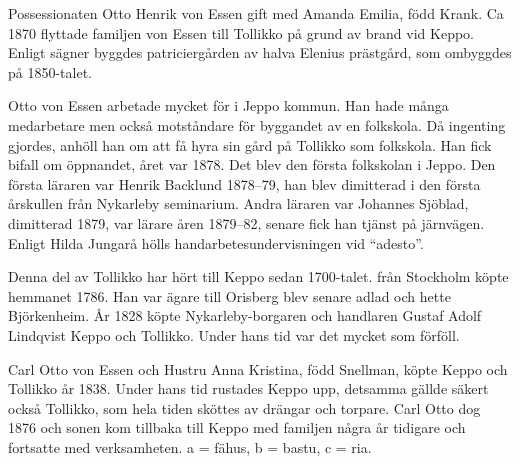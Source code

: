 Possessionaten Otto Henrik von Essen gift med Amanda Emilia, född Krank. Ca 1870 flyttade familjen von Essen till Tollikko på grund av brand vid Keppo. Enligt sägner byggdes patriciergården av halva Elenius prästgård, som ombyggdes på 1850-talet.

Otto von Essen arbetade mycket för  i Jeppo kommun. Han hade många medarbetare men också motståndare för byggandet av en folkskola. Då ingenting gjordes, anhöll han om att få hyra sin gård på Tollikko som folkskola. Han fick bifall om öppnandet, året var 1878. Det blev den första folkskolan i Jeppo. Den första läraren var Henrik Backlund 1878--79, han blev dimitterad i den första årskullen från Nykarleby seminarium. Andra läraren var Johannes Sjöblad, dimitterad 1879, var lärare åren 1879--82, senare fick han tjänst på järnvägen. Enligt Hilda Jungarå hölls handarbetesundervisningen vid ``adesto''.

Denna del av Tollikko har hört till Keppo sedan 1700-talet.  från Stockholm köpte hemmanet 1786. Han var ägare till Orisberg blev senare adlad och hette Björkenheim. År 1828 köpte Nykarleby-borgaren och handlaren Gustaf Adolf Lindqvist Keppo och Tollikko. Under hans tid var det mycket som förföll.


%
Carl Otto von Essen och Hustru Anna Kristina, född Snellman, köpte Keppo och Tollikko år 1838. Under hans tid rustades Keppo upp, detsamma gällde säkert också Tollikko, som hela tiden sköttes av drängar och torpare. Carl Otto dog 1876 och sonen kom tillbaka till Keppo med familjen några år tidigare och fortsatte med 	verksamheten. a = fähus, b = bastu, c = ria.



%



